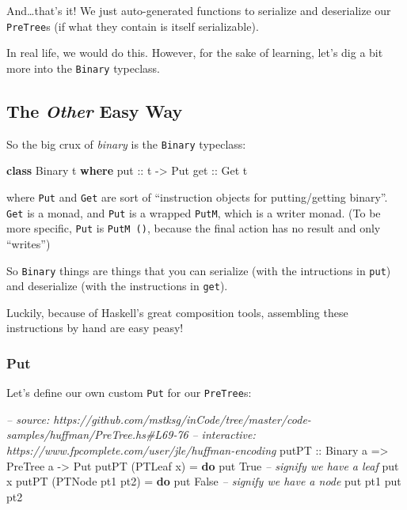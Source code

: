 \documentclass[]{article}
\newenvironment{Shaded}{\begin{snugshade}}{\end{snugshade}}
\newcommand{\CommentTok}[1]{\textcolor[rgb]{0.56,0.35,0.01}{\textit{#1}}}
\newcommand{\DataTypeTok}[1]{\textcolor[rgb]{0.13,0.29,0.53}{#1}}
\newcommand{\FunctionTok}[1]{\textcolor[rgb]{0.00,0.00,0.00}{#1}}
\newcommand{\KeywordTok}[1]{\textcolor[rgb]{0.13,0.29,0.53}{\textbf{#1}}}
\newcommand{\NormalTok}[1]{#1}
\newcommand{\OtherTok}[1]{\textcolor[rgb]{0.56,0.35,0.01}{#1}}
\begin{document}
And\ldots{}that's it! We just auto-generated functions to serialize and
deserialize our \texttt{PreTree}s (if what they contain is itself serializable).

In real life, we would do this. However, for the sake of learning, let's dig a
bit more into the \texttt{Binary} typeclass.

\hypertarget{the-other-easy-way}{%
\subsection{\texorpdfstring{The \emph{Other} Easy
Way}{The Other Easy Way}}\label{the-other-easy-way}}

So the big crux of \emph{binary} is the \texttt{Binary} typeclass:

\begin{Shaded}
\begin{Highlighting}[]
\KeywordTok{class} \DataTypeTok{Binary}\NormalTok{ t }\KeywordTok{where}
\OtherTok{    put ::}\NormalTok{ t }\OtherTok{->} \DataTypeTok{Put}
\OtherTok{    get ::} \DataTypeTok{Get}\NormalTok{ t}
\end{Highlighting}
\end{Shaded}

where \texttt{Put} and \texttt{Get} are sort of ``instruction objects for
putting/getting binary''. \texttt{Get} is a monad, and \texttt{Put} is a wrapped
\texttt{PutM}, which is a writer monad. (To be more specific, \texttt{Put} is
\texttt{PutM\ ()}, because the final action has no result and only ``writes'')

So \texttt{Binary} things are things that you can serialize (with the
intructions in \texttt{put}) and deserialize (with the instructions in
\texttt{get}).

Luckily, because of Haskell's great composition tools, assembling these
instructions by hand are easy peasy!

\hypertarget{put}{%
\subsubsection{Put}\label{put}}

Let's define our own custom \texttt{Put} for our \texttt{PreTree}s:

\begin{Shaded}
\begin{Highlighting}[]
\CommentTok{-- source: https://github.com/mstksg/inCode/tree/master/code-samples/huffman/PreTree.hs#L69-76}
\CommentTok{-- interactive: https://www.fpcomplete.com/user/jle/huffman-encoding}
\OtherTok{putPT ::} \DataTypeTok{Binary}\NormalTok{ a }\OtherTok{=>} \DataTypeTok{PreTree}\NormalTok{ a }\OtherTok{->} \DataTypeTok{Put}
\NormalTok{putPT (}\DataTypeTok{PTLeaf}\NormalTok{ x) }\FunctionTok{=} \KeywordTok{do}
\NormalTok{    put }\DataTypeTok{True}                    \CommentTok{-- signify we have a leaf}
\NormalTok{    put x}
\NormalTok{putPT (}\DataTypeTok{PTNode}\NormalTok{ pt1 pt2) }\FunctionTok{=} \KeywordTok{do}
\NormalTok{    put }\DataTypeTok{False}                   \CommentTok{-- signify we have a node}
\NormalTok{    put pt1}
\NormalTok{    put pt2}
\end{Highlighting}
\end{Shaded}
\end{document}
